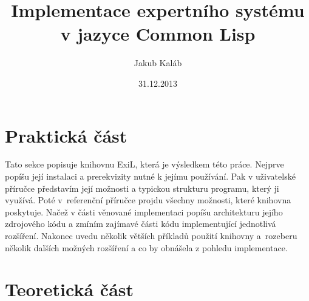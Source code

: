 \documentclass[12pt]{article}
\title{Implementace expertního systému v jazyce Common Lisp}
\author{Jakub Kaláb}
\date{31.12.2013}
\begin{document}
\maketitle
\renewcommand\listoflistingscaption{Seznam příkladů}
\renewcommand\listingscaption{Příklad}
\listoflistings
{}

\nocite{introduction}
\nocite{paradigms}
\nocite{doorenbos}
\nocite{practical}
\nocite{clips}
\nocite{clhs}
\nocite{expert-system}
\nocite{rete}

\clearpage


\clearpage
\section{Praktická část}

Tato sekce popisuje knihovnu ExiL\footnotemark, která je výsledkem této práce.
Nejprve popíšu její instalaci a prerekvizity nutné k jejímu používání. Pak v
uživatelské příručce představím její možnosti a typickou strukturu programu,
který ji využívá.  Poté v~referenční příručce projdu všechny možnosti, které
knihovna poskytuje.  Načež v části věnované implementaci popíšu architekturu
jejího zdrojového kódu a zmíním zajímavé části kódu implementující jednotlivá
rozšíření.  Nakonec uvedu několik větších příkladů použití knihovny a~rozeberu
několik dalších možných rozšíření a co by obnášela z pohledu implementace.




\clearpage

% 
\clearpage


\clearpage
\section{Teoretická část}


\clearpage

% 

\end{document}
